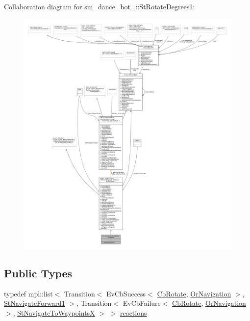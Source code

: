Collaboration diagram for sm\+\_\+dance\+\_\+bot\+\_\+:\+:St\+Rotate\+Degrees1\+:
\nopagebreak
\begin{figure}[H]
\begin{center}
\leavevmode
\includegraphics[width=350pt]{structsm__dance__bot__2_1_1StRotateDegrees1__coll__graph}
\end{center}
\end{figure}
\subsection*{Public Types}
\begin{DoxyCompactItemize}
\item 
typedef mpl\+::list$<$ Transition$<$ Ev\+Cb\+Success$<$ \hyperlink{classcl__move__base__z_1_1CbRotate}{Cb\+Rotate}, \hyperlink{classsm__dance__bot__2_1_1OrNavigation}{Or\+Navigation} $>$, \hyperlink{structsm__dance__bot__2_1_1StNavigateForward1}{St\+Navigate\+Forward1} $>$, Transition$<$ Ev\+Cb\+Failure$<$ \hyperlink{classcl__move__base__z_1_1CbRotate}{Cb\+Rotate}, \hyperlink{classsm__dance__bot__2_1_1OrNavigation}{Or\+Navigation} $>$, \hyperlink{structsm__dance__bot__2_1_1StNavigateToWaypointsX}{St\+Navigate\+To\+WaypointsX} $>$ $>$ \hyperlink{structsm__dance__bot__2_1_1StRotateDegrees1_a3029207ceb9815658e5d07480dd754f0}{reactions}
\end{DoxyCompactItemize}
